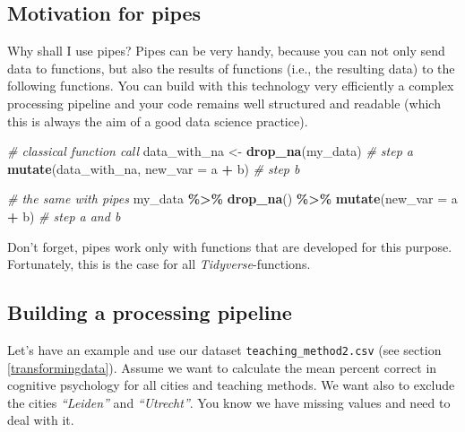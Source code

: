 \documentclass[
]{scrartcl}
\makeatletter
\newenvironment{Shaded}{\begin{snugshade}}{\end{snugshade}}
\newcommand{\CommentTok}[1]{\textcolor[rgb]{0.56,0.35,0.01}{\textit{#1}}}
\newcommand{\DataTypeTok}[1]{\textcolor[rgb]{0.13,0.29,0.53}{#1}}
\newcommand{\KeywordTok}[1]{\textcolor[rgb]{0.13,0.29,0.53}{\textbf{#1}}}
\newcommand{\NormalTok}[1]{#1}
\newcommand{\OperatorTok}[1]{\textcolor[rgb]{0.81,0.36,0.00}{\textbf{#1}}}
\newcommand{\StringTok}[1]{\textcolor[rgb]{0.31,0.60,0.02}{#1}}
\newenvironment{kframe}{%
\medskip{}
\setlength{\fboxsep}{.8em}
 \def\at@end@of@kframe{}%
 \ifinner\ifhmode%
  \def\at@end@of@kframe{\end{minipage}}%
  \begin{minipage}{\columnwidth}%
 \fi\fi%
 \def\FrameCommand##1{\hskip\@totalleftmargin \hskip-\fboxsep
 \colorbox{shadecolor}{##1}\hskip-\fboxsep
     \hskip-\linewidth \hskip-\@totalleftmargin \hskip\columnwidth}%
 \MakeFramed {\advance\hsize-\width
   \@totalleftmargin\z@ \linewidth\hsize
   \@setminipage}}%
 {\par\unskip\endMakeFramed%
 \at@end@of@kframe}
\newenvironment{rmdblock}[1]
  {
  \begin{itemize}
  \renewcommand{\labelitemi}{
    \raisebox{-.7\height}[0pt][0pt]{
      {\setkeys{Gin}{width=3em,keepaspectratio}\texttt{[image: images/\#1]}}
    }
  }
  \setlength{\fboxsep}{1em}
  \begin{kframe}
  \item
  }
  {
  \end{kframe}
  \end{itemize}
  }
\newenvironment{important}
    {\begin{rmdblock}{hint}}
    {\end{rmdblock}}
\makeatother
\begin{document}
\hypertarget{motivation-for-pipes}{%
\subsection{Motivation for pipes}\label{motivation-for-pipes}}

Why shall I use pipes? Pipes can be very handy, because you can not only send data to functions, but also the results of functions (i.e., the resulting data) to the following functions. You can build with this technology very efficiently a complex processing pipeline and your code remains well structured and readable (which this is always the aim of a good data science practice).

\begin{Shaded}
\begin{Highlighting}[]
\CommentTok{\# classical function call}
\NormalTok{data\_with\_na \textless{}{-}}\StringTok{ }\KeywordTok{drop\_na}\NormalTok{(my\_data)                }\CommentTok{\# step a}
\KeywordTok{mutate}\NormalTok{(data\_with\_na, }\DataTypeTok{new\_var =}\NormalTok{ a }\OperatorTok{+}\StringTok{ }\NormalTok{b) }\CommentTok{\# step b}

\CommentTok{\# the same with pipes}
\NormalTok{my\_data }\OperatorTok{\%\textgreater{}\%}\StringTok{ }\KeywordTok{drop\_na}\NormalTok{() }\OperatorTok{\%\textgreater{}\%}\StringTok{ }\KeywordTok{mutate}\NormalTok{(}\DataTypeTok{new\_var =}\NormalTok{ a }\OperatorTok{+}\StringTok{ }\NormalTok{b)  }\CommentTok{\# step a and b}
\end{Highlighting}
\end{Shaded}

\begin{important}
 Don't forget, pipes work only with functions that are developed for this
 purpose. Fortunately, this is the case for all
 \emph{Tidyverse}-functions.
 \end{important}

\hypertarget{building-a-processing-pipeline}{%
\subsection{Building a processing pipeline}\label{building-a-processing-pipeline}}

Let's have an example and use our dataset \texttt{teaching\_method2.csv} (see section \ref{transformingdata}). Assume we want to calculate the mean percent correct in cognitive psychology for all cities and teaching methods. We want also to exclude the cities \emph{``Leiden''} and \emph{``Utrecht''}. You know we have missing values and need to deal with it.
\end{document}
